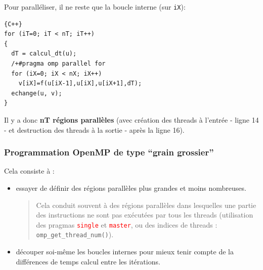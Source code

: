 \documentclass{beamer}
\begin{document}
\begin{frame}[fragile]
Pour paralléliser, il ne reste que la boucle interne (sur \verb|iX|):


\begin{lstlisting}{C++}
for (iT=0; iT < nT; iT++)
{
  dT = calcul_dt(u);
  /+#pragma omp parallel for
  for (iX=0; iX < nX; iX++)
    v[iX]=f(u[iX-1],u[iX],u[iX+1],dT);
  echange(u, v);
}
\end{lstlisting}

\vfill
Il y a donc {\bf nT régions parallèles} (avec création des threads à l'entrée - ligne 14 - et destruction des threads à la sortie - après la ligne 16).
\vfill
\end{frame}

\begin{frame}[fragile]
	\frametitle{Programmation OpenMP de type ``grain grossier''}

\vfill
Cela consiste à :
\medskip

\begin{itemize}
	\item 
	essayer de définir des régions parallèles plus grandes et moins nombreuses.
\vfill

\begin{quote}
	Cela conduit souvent à des régions parallèles dans lesquelles une partie des instructions ne sont pas exécutées par tous les threads (utilisation des pragmas \textcolor{red}{\tt single} et \textcolor{red}{\tt master}, ou des indices de threads : {\tt omp\_get\_thread\_num()}).
\end{quote}

	\item découper soi-même les boucles internes pour mieux tenir compte de la différences de temps calcul entre les itérations.
\end{itemize}

\vfill
\end{frame}
\end{document}
